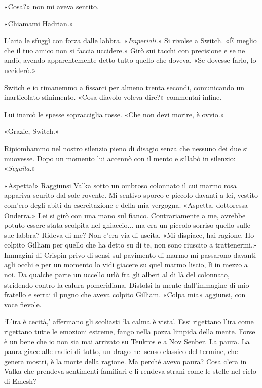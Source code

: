 «Cosa?» non mi aveva sentito.

«Chiamami Hadrian.»

L'aria le sfuggì con forza dalle labbra. «\emph{Imperiali}.» Si rivolse
a Switch. «È meglio che il tuo amico non si faccia uccidere.» Girò sui
tacchi con precisione e se ne andò, avendo apparentemente detto tutto
quello che doveva. «Se dovesse farlo, lo ucciderò.»

Switch e io rimanemmo a fissarci per almeno trenta secondi, comunicando
un inarticolato sfinimento. «Cosa diavolo voleva dire?» commentai
infine.

Lui inarcò le spesse sopracciglia rosse. «Che non devi morire, è ovvio.»

«Grazie, Switch.»

Ripiombammo nel nostro silenzio pieno di disagio senza che nessuno dei
due si muovesse. Dopo un momento lui accennò con il mento e sillabò in
silenzio: «\emph{Seguila}.»

\begin{figure}
	\centering
	\def\svgwidth{\columnwidth}
	\scalebox{0.2}{}
\end{figure}

«Aspetta!» Raggiunsi Valka sotto un ombroso colonnato il cui marmo rosa
appariva scurito dal sole rovente. Mi sentivo sporco e piccolo davanti a
lei, vestito com'ero degli abiti da esercitazione e della mia vergogna.
«Aspetta, dottoressa Onderra.» Lei si girò con una mano sul fianco.
Contrariamente a me, avrebbe potuto essere stata scolpita nel
ghiaccio... ma era un piccolo sorriso quello sulle sue labbra? Rideva di
me? Non c'era via di uscita. «Mi dispiace, hai ragione. Ho colpito
Gilliam per quello che ha detto su di te, non sono riuscito a
trattenermi.» Immagini di Crispin privo di sensi sul pavimento di marmo
mi passarono davanti agli occhi e per un momento lo vidi giacere su quel
marmo liscio, lì in mezzo a noi. Da qualche parte un uccello urlò fra
gli alberi al di là del colonnato, stridendo contro la calura
pomeridiana. Distolsi la mente dall'immagine di mio fratello e serrai il
pugno che aveva colpito Gilliam. «Colpa mia» aggiunsi, con voce fievole.

`L'ira è cecità,' affermano gli scoliasti `la calma è vista'. Essi
rigettano l'ira come rigettano tutte le emozioni estreme, fango nella
pozza limpida della mente. Forse è un bene che io non sia mai arrivato
su Teukros e a Nov Senber. La paura. La paura giace alle radici di
tutto, un drago nel senso classico del termine, che genera mostri, è la
morte della ragione. Ma perché avevo paura? Cosa c'era in Valka che
prendeva sentimenti familiari e li rendeva strani come le stelle nel
cielo di Emesh?

